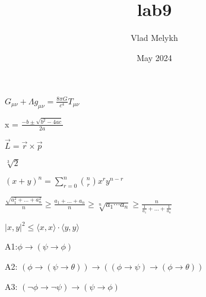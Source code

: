 \documentclass{article}
\title{lab9}
\author{Vlad Melykh}
\date{May 2024}
\begin{document}
\maketitle





$G_{\mu\nu} + \Lambda g_{\mu\nu} = \frac{8 \pi G}{c^4} T_{\mu\nu}$ 

x = $\frac{{-b \pm \sqrt{b^2 - 4ac}}}{{2a}}$

$\vec{L} = \vec{r} \times \vec{p}$

$\sqrt[3]{2}$

$(x + y)^n = \sum_{r=0}^{n} \binom{n}{r} x^r y^{n-r}$

$\frac{\sqrt{a_1^2+ \dots + a_n^2}}{n}  \geq \frac{a_1 + \dots + a_n}{n} \geq \sqrt[n]{ a_1 \dotsm a_n }\geq \frac{n}{\frac{1}{a_1} + \dots + \frac{1}{a_n}}$

$|x, y|^2 \leq \langle x, x \rangle \cdot \langle y, y \rangle $

A1:$ \phi \rightarrow (\psi \rightarrow \phi) $

A2: $(\phi \rightarrow (\psi \rightarrow \theta)) \rightarrow ((\phi \rightarrow \psi) \rightarrow (\phi \rightarrow \theta))$

A3: $(\neg \phi \rightarrow \neg \psi) \rightarrow (\psi \rightarrow \phi)$
\end{document}
